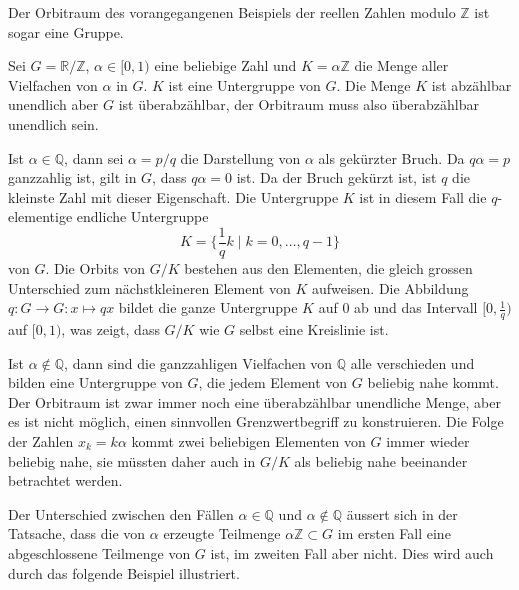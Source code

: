 Der Orbitraum des vorangegangenen Beispiels der reellen Zahlen
modulo $\mathbb{Z}$ ist sogar eine Gruppe.

\begin{beispiel}
Sei $G=\mathbb{R}/\mathbb{Z}$,
$\alpha\in [0,1)$ eine beliebige Zahl und $K=\alpha\mathbb{Z}$
die Menge aller Vielfachen von $\alpha$ in $G$.
$K$ ist eine Untergruppe von $G$.
Die Menge $K$ ist abzählbar unendlich aber $G$ ist überabzählbar,
der Orbitraum muss also überabzählbar unendlich sein.

Ist $\alpha\in\mathbb{Q}$, dann sei $\alpha=p/q$ die Darstellung
von $\alpha$ als gekürzter Bruch.
Da $q\alpha=p$ ganzzahlig ist, gilt in $G$, dass $q\alpha=0$ ist.
Da der Bruch gekürzt ist, ist $q$ die kleinste Zahl mit dieser
Eigenschaft.
Die Untergruppe $K$ ist in diesem Fall die $q$-elementige endliche
Untergruppe
\[
K = \biggl\{ \frac1qk \;\bigg|\; k=0,\dots,q-1 \biggr\}
\]
von $G$.
Die Orbits von $G/K$ bestehen aus den Elementen, die gleich grossen
Unterschied zum nächstkleineren Element von $K$ aufweisen.
Die Abbildung $q\colon G \to G: x\mapsto qx$ bildet die ganze
Untergruppe $K$ auf $0$ ab und das Intervall $[0,\frac1q)$ auf
$[0,1)$, was zeigt, dass $G/K$ wie $G$ selbst eine Kreislinie ist.

Ist $\alpha\not\in \mathbb{Q}$, dann sind die ganzzahligen Vielfachen
von $\mathbb{Q}$ alle verschieden und bilden eine Untergruppe von $G$,
die jedem Element von $G$ beliebig nahe kommt.
Der Orbitraum ist zwar immer noch eine überabzählbar unendliche
Menge, aber es ist nicht möglich, einen sinnvollen Grenzwertbegriff
zu konstruieren.
Die Folge der Zahlen $x_k=k\alpha$ kommt zwei beliebigen Elementen
von $G$ immer wieder beliebig nahe, sie müssten daher auch in $G/K$
als beliebig nahe beeinander betrachtet werden.
\end{beispiel}

Der Unterschied zwischen den Fällen $\alpha\in\mathbb{Q}$ und
$\alpha\not\in\mathbb{Q}$ äussert sich in der Tatsache, dass
die von $\alpha$ erzeugte Teilmenge $\alpha\mathbb{Z}\subset G$ 
im ersten Fall eine abgeschlossene Teilmenge von $G$ ist,
im zweiten Fall aber nicht.
Dies wird auch durch das folgende Beispiel illustriert.

